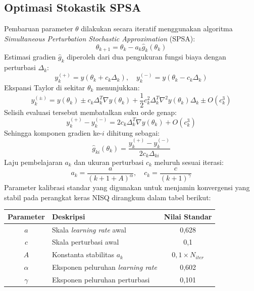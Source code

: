 \subsection{Optimasi Stokastik SPSA}
Pembaruan parameter $\theta$ dilakukan secara iteratif menggunakan algoritma \textit{Simultaneous Perturbation Stochastic Approximation} (SPSA):
\begin{equation}
\theta_{k+1} = \theta_k - a_k \hat{g}_k(\theta_k)
\end{equation}
Estimasi gradien $\hat{g}_k$ diperoleh dari dua pengukuran fungsi biaya dengan perturbasi $\Delta_k$:
\begin{equation}
y_k^{(+)} = y(\theta_k + c_k \Delta_k), \quad y_k^{(-)} = y(\theta_k - c_k \Delta_k)
\end{equation}
Ekspansi Taylor di sekitar $\theta_k$ menunjukkan:
\begin{equation}
y_k^{(\pm)} = y(\theta_k) \pm c_k \Delta_k^T \nabla y(\theta_k) + \frac{1}{2} c_k^2 \Delta_k^T \nabla^2 y(\theta_k) \Delta_k \pm O(c_k^3)
\end{equation}
Selisih evaluasi tersebut membatalkan suku orde genap:
\begin{equation}
y_k^{(+)} - y_k^{(-)} = 2 c_k \Delta_k^T \nabla y(\theta_k) + O(c_k^3)
\end{equation}
Sehingga komponen gradien ke-$i$ dihitung sebagai:
\begin{equation}
\hat{g}_{ki}(\theta_k) = \frac{y_k^{(+)} - y_k^{(-)}}{2 c_k \Delta_{ki}}
\end{equation}
Laju pembelajaran $a_k$ dan ukuran perturbasi $c_k$ meluruh sesuai iterasi:
\begin{equation}
a_k = \frac{a}{(k+1+A)^\alpha}, \quad c_k = \frac{c}{(k+1)^\gamma}
\end{equation}
Parameter kalibrasi standar yang digunakan untuk menjamin konvergensi yang stabil pada perangkat keras NISQ dirangkum dalam tabel berikut:
\begin{center}
\begin{tabular}{|c|l|c|}
\hline
\textbf{Parameter} & \textbf{Deskripsi} & \textbf{Nilai Standar} \\ \hline
$a$ & Skala \textit{learning rate} awal & 0,628 \\ \hline
$c$ & Skala perturbasi awal & 0,1 \\ \hline
$A$ & Konstanta stabilitas $a_k$ & $0,1 \times N_{iter}$ \\ \hline
$\alpha$ & Eksponen peluruhan \textit{learning rate} & 0,602 \\ \hline
$\gamma$ & Eksponen peluruhan perturbasi & 0,101 \\ \hline
\end{tabular}
\end{center}

